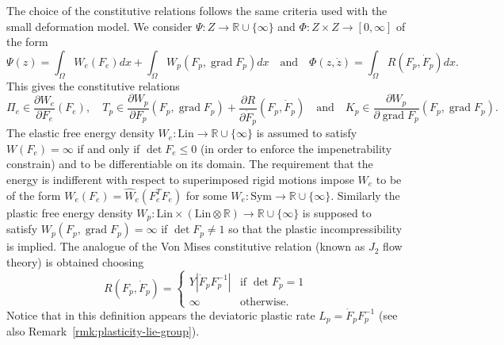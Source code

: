 \documentclass[a4paper,10pt,twoside]{amsbook}
\numberwithin{section}{chapter}
\numberwithin{equation}{chapter}
\theoremstyle{definition}
\DeclareMathOperator{\grad}{grad}
\newcommand{\dind}[2]{\frac{\partial #1}{\partial #2}}
\begin{document}
The choice of the constitutive relations follows the same criteria used with the small deformation model. We consider $\Psi\colon Z\to\mathbb{R}\cup\{\infty\}$ and $\Phi\colon Z\times Z\to[0,\infty]$ of the form
\[
\Psi(z)=\int_\Omega W_e(F_e)dx+\int_\Omega W_p(F_p,\grad F_p)dx\quad\text{and}\quad\Phi(z,\dot z)=\int_\Omega R(F_p,\dot F_p)dx.
\]
This gives the constitutive relations
\[
\Pi_e\in\dind{W_e}{F_e}(F_e),\quad T_p\in\dind{W_p}{F_p}(F_p,\grad F_p)+\dind{R}{\dot F_p}(F_p,\dot F_p)\quad\text{and}\quad K_p\in\dind{W_p}{\grad F_p}(F_p,\grad F_p).
\]
The elastic free energy density $W_e\colon\text{Lin}\to\mathbb{R}\cup\{\infty\}$ is assumed to satisfy $W(F_e)=\infty$ if and only if $\det F_e\le0$ (in order to enforce the impenetrability constrain) and to be differentiable on its domain. The requirement that the energy is indifferent with respect to superimposed rigid motions impose $W_e$ to be of the form $W_e(F_e)=\hat{W}_e(F_e^TF_e)$ for some $W_e\colon\text{Sym}\to\mathbb{R}\cup\{\infty\}$. Similarly the plastic free energy density $W_p\colon\text{Lin}\times\left(\text{Lin}\otimes\mathbb{R}\right)\to\mathbb{R}\cup\{\infty\}$ is supposed to satisfy $W_p(F_p,\grad F_p)=\infty$ if $\det F_p\neq1$ so that the plastic incompressibility is implied. The analogue of the Von Mises constitutive relation (known as $J_2$ flow theory) is obtained choosing
\begin{equation}
\label{eqn:R-large-3D}
R(F_p,\dot F_p)=\begin{cases}
Y|\dot F_pF_p^{-1}| & \text{if $\det F_p=1$} \\
\infty & \text{otherwise}.
\end{cases}
\end{equation}
Notice that in this definition appears the deviatoric plastic rate $L_p=\dot F_pF_p^{-1}$ (see also Remark~\ref{rmk:plasticity-lie-group}).
\end{document}
